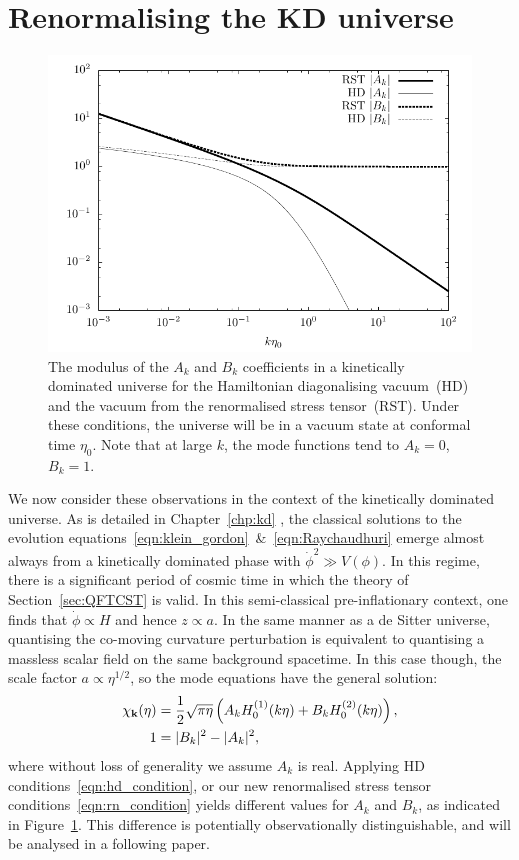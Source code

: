 \section{Renormalising the KD universe}
\begin{figure}[tp]
  \centering
  \includegraphics[width=\columnwidth]{chapters/quantum_vacuum/figures/Ak.pdf}
  \caption{The modulus of the \(A_k\) and \(B_k\) coefficients in a kinetically dominated universe for the Hamiltonian diagonalising vacuum~(HD) and the vacuum from the renormalised stress tensor~(RST). Under these conditions, the universe will be in a vacuum state at conformal time \(\eta_0\). Note that at large \(k\), the mode functions tend to \(A_k=0\), \(B_k=1\).}\label{fig:Ak}
\end{figure}
We now consider these observations in the context of the kinetically dominated universe. 
As is detailed in Chapter~\ref{chp:kd} \citep[and in][]{Handley+2014}, the classical solutions to the evolution equations~\eqref{eqn:klein_gordon}~\&~\eqref{eqn:Raychaudhuri} emerge almost always from a kinetically dominated phase with \(\dot{\phi}^2\gg V(\phi)\). 
In this regime, there is a significant period of cosmic time in which the theory of Section~\ref{sec:QFTCST} is valid. 
In this semi-classical pre-inflationary context, one finds that \(\dot{\phi}\propto H\) and hence \({z\propto a}\). 
In the same manner as a de Sitter universe, quantising the co-moving curvature perturbation is equivalent to quantising a massless scalar field on the same background spacetime. 
In this case though, the scale factor \({a \propto \eta^{1/2}}\), so the mode equations have the general solution:
\begin{align}
  \chi_{\mathbf{k}}(\eta) &= \frac{1}{2}\sqrt{\pi\eta}\left( A_k H_{0}^{(1)}(k\eta) + B_k H_{0}^{(2)}(k\eta) \right), \nonumber \\
  1&=|B_k|^2 - |A_k|^2, \label{eqn:kd_modes} 
\end{align}
where without loss of generality we assume \(A_k\) is real.
Applying HD conditions~\eqref{eqn:hd_condition}, or our new renormalised stress tensor conditions~\eqref{eqn:rn_condition} yields different values for \(A_k\) and \(B_k\), as indicated in Figure~\ref{fig:Ak}. This difference is potentially observationally distinguishable, and will be analysed in a following paper.


